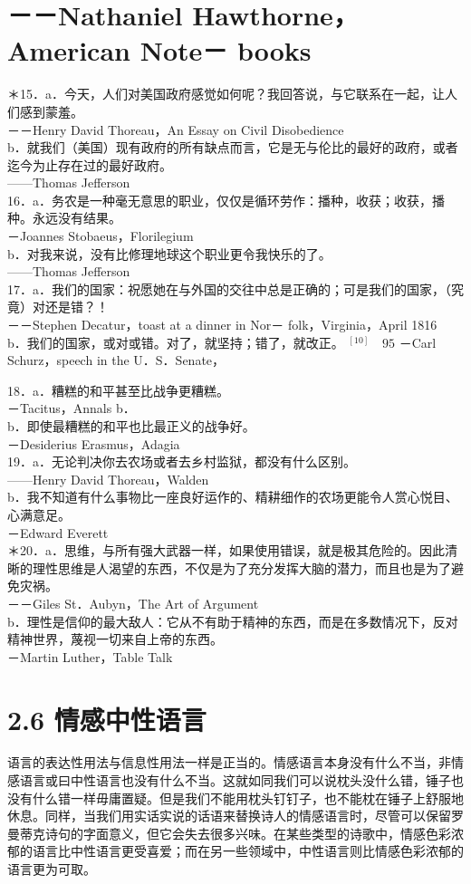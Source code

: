 \section*{－－Nathaniel Hawthorne，American Note－ books}
＊15．a．今天，人们对美国政府感觉如何呢？我回答说，与它联系在一起，让人们感到蒙羞。\\
－－Henry David Thoreau，An Essay on Civil Disobedience\\
b．就我们（美国）现有政府的所有缺点而言，它是无与伦比的最好的政府，或者迄今为止存在过的最好政府。\\
——Thomas Jefferson\\
16．a．务农是一种毫无意思的职业，仅仅是循环劳作：播种，收获；收获，播种。永远没有结果。\\
－Joannes Stobaeus，Florilegium\\
b．对我来说，没有比修理地球这个职业更令我快乐的了。\\
——Thomas Jefferson\\
17．a．我们的国家：祝愿她在与外国的交往中总是正确的；可是我们的国家，（究竟）对还是错？！\\
－－Stephen Decatur，toast at a dinner in Nor－ folk，Virginia，April 1816\\
b．我们的国家，或对或错。对了，就坚持；错了，就改正。 ${ }^{[10]} \quad 95$ －Carl Schurz，speech in the U．S．Senate，

18．a．糟糕的和平甚至比战争更糟糕。\\
－Tacitus，Annals b．\\
b．即使最糟糕的和平也比最正义的战争好。\\
－Desiderius Erasmus，Adagia\\
19．a．无论判决你去农场或者去乡村监狱，都没有什么区别。\\
——Henry David Thoreau，Walden\\
b．我不知道有什么事物比一座良好运作的、精耕细作的农场更能令人赏心悦目、心满意足。\\
－Edward Everett\\
＊20．a．思维，与所有强大武器一样，如果使用错误，就是极其危险的。因此清晰的理性思维是人渴望的东西，不仅是为了充分发挥大脑的潜力，而且也是为了避免灾祸。\\
－－Giles St．Aubyn，The Art of Argument\\
b．理性是信仰的最大敌人：它从不有助于精神的东西，而是在多数情况下，反对精神世界，蔑视一切来自上帝的东西。\\
－Martin Luther，Table Talk

\section*{2.6 情感中性语言}
语言的表达性用法与信息性用法一样是正当的。情感语言本身没有什么不当，非情感语言或曰中性语言也没有什么不当。这就如同我们可以说枕头没什么错，锤子也没有什么错一样毋庸置疑。但是我们不能用枕头钉钉子，也不能枕在锤子上舒服地休息。同样，当我们用实话实说的话语来替换诗人的情感语言时，尽管可以保留罗曼蒂克诗句的字面意义，但它会失去很多兴味。在某些类型的诗歌中，情感色彩浓郁的语言比中性语言更受喜爱；而在另一些领域中，中性语言则比情感色彩浓郁的语言更为可取。

